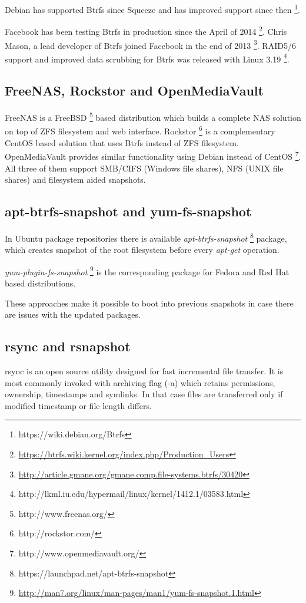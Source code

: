 \documentclass{article}
\begin{document}
Debian has supported Btrfs since Squeeze and has improved support since then
\footnote{https://wiki.debian.org/Btrfs}.  

Facebook has been testing Btrfs in production since the April of 2014
\footnote{\url{https://btrfs.wiki.kernel.org/index.php/Production_Users}}.
Chris Mason, a lead developer of Btrfs joined Facebook in the end of 2013
\footnote{\url{http://article.gmane.org/gmane.comp.file-systems.btrfs/30420}}.
RAID5/6 support and improved data scrubbing for Btrfs was released with Linux
3.19 \footnote{http://lkml.iu.edu/hypermail/linux/kernel/1412.1/03583.html}.


\subsection{FreeNAS, Rockstor and OpenMediaVault}

FreeNAS is a FreeBSD \footnote{http://www.freenas.org/}
based distribution which builds a complete NAS solution on top of
ZFS filesystem and web interface.
Rockstor \footnote{http://rockstor.com/}
is a complementary CentOS based solution that uses Btrfs instead
of ZFS filesystem.
OpenMediaVault provides similar functionality using Debian instead of CentOS
\footnote{http://www.openmediavault.org/}.
All three of them support SMB/CIFS (Windows file shares),
NFS (UNIX file shares) and filesystem aided snapshots.


\subsection{apt-btrfs-snapshot and yum-fs-snapshot}

In Ubuntu package repositories there is available \emph{apt-btrfs-snapshot}
\footnote{https://launchpad.net/apt-btrfs-snapshot} package,
which creates snapshot of the root filesystem before every
\emph{apt-get} operation.

\emph{yum-plugin-fs-snapshot}
\footnote{\url{http://man7.org/linux/man-pages/man1/yum-fs-snapshot.1.html}}
is the corresponding package for Fedora and
Red Hat based distributions.

These approaches make it possible to boot into previous snapshots
in case there are issues with the updated packages.


\subsection{rsync and rsnapshot}

rsync is an open source utility designed for fast incremental file transfer.
It is most commonly invoked with archiving flag (-a) which retains permissions, ownership, timestamps and symlinks. In that case files are transferred only if
modified timestamp or file length differs.
\end{document}
